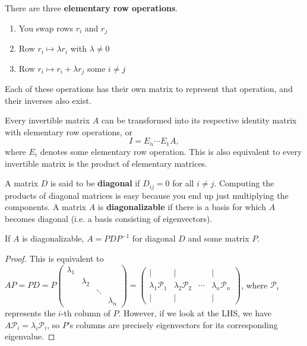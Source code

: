 \begin{df}
There are three \textbf{elementary row operations}.
\begin{enumerate}
\item You swap rows $r_i$ and $r_j$
\item Row $r_i \mapsto \lambda r_i$ with $\lambda \neq 0$
\item Row $r_i \mapsto r_i + \lambda r_j$ some $i \neq j$
\end{enumerate}
Each of these operations has their own matrix to represent that
operation, and their inverses also exist.
\end{df}

\begin{prop}
Every invertible matrix $A$ can be transformed into its respective
identity matrix with elementary row operations, or
\[ I = E_n \cdots E_1 A, \]
where $E_i$ denotes some elementary row operation. This is also
equivalent to every invertible matrix is the product of elementary
matrices.
\end{prop}

\begin{df}
A matrix $D$ is said to be \textbf{diagonal} if $D_{ij} = 0$ for all $i
\neq j$.  Computing the products of diagonal matrices is easy because
you end up just multiplying the components. A matrix $A$ is
\textbf{diagonalizable} if there is a basis for which $A$ becomes
diagonal (i.e. a basis consisting of eigenvectors).
\end{df}

\begin{prop}
If $A$ is diagonalizable, $A = PDP^{-1}$ for diagonal $D$ and some
matrix $P$.
\end{prop}

\begin{proof}
This is equivalent to $AP = PD = P \begin{pmatrix} \lambda_1 & & \\ &
\lambda_2 & & \\ & & \ddots & \\ & & & \lambda_n \end{pmatrix} =
\begin{pmatrix} | & | & & | \\ \lambda_1 \mathcal{P}_1 & \lambda_2
\mathcal{P}_2 & \cdots & \lambda_n \mathcal{P}_n \\ | & | & & |
\end{pmatrix}$, where $\mathcal{P}_i$ represents the $i$-th column of
$P$. However, if we look at the LHS, we have $A \mathcal{P}_i =
\lambda_i \mathcal{P}_i$, so $P$'s columns are precisely eigenvectors
for its corresponding eigenvalue.
\end{proof}

